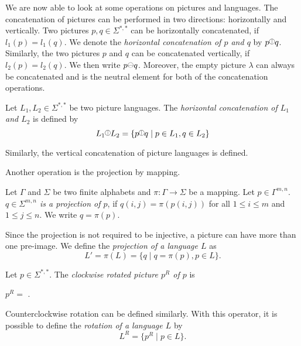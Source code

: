 We are now able to look at some operations on pictures and languages. The concatenation of pictures
can be performed in two directions: horizontally and vertically.
Two pictures $p, q \in \Sigma^{*,*}$ can be horizontally concatenated, if $l_1(p) = l_1(q)$. We denote
the \emph{horizontal concatenation of $p$ and $q$} by $p \hcat{} q$. Similarly, the two pictures $p$
and $q$ can be concatenated vertically, if $l_2(p) = l_2(q)$. We then write $p \vcat{} q$. Moreover,
the empty picture $\lambda$ can always be concatenated and is the neutral element for both of the
concatenation operations.
\begin{definition}
	Let $L_1, L_2 \in \Sigma^{*,*}$ be two picture languages. The \emph{horizontal concatenation of
	$L_1$ and $L_2$} is defined by 
	\[L_1 \hcat{} L_2 = \{p \hcat{} q \mid p \in L_1, q \in L_2\}\]
\end{definition}
Similarly, the vertical concatenation of picture languages is defined. 

Another operation is the projection by mapping.
\begin{definition}
	Let $\Gamma$ and $\Sigma$ be two finite alphabets and $\pi: \Gamma \rightarrow \Sigma$ be a
	mapping. Let $p \in \Gamma^{m,n}$. \emph{$q \in \Sigma^{m,n}$ is a projection of $p$}, if $q(i, j)
	= \pi(p(i, j))$ for all $1 \leq i \leq m$ and $1 \leq j \leq n$. We write $q = \pi(p)$.
\end{definition}
Since the projection is not required to be injective, a picture can have more than one pre-image. We
define the \emph{projection of a language $L$} as 
\[L' = \pi(L) = \{q \mid q = \pi(p), p \in L\}.\] 
\begin{definition}
	Let $p \in \Sigma^{*, *}$. The \emph{clockwise rotated picture $p^R$ of $p$} is 
	\begin{center}
	
		$p^R = $ .
	\end{center}
\end{definition}
Counterclockwise rotation can be defined similarly. With this operator, it is possible to define the
\emph{rotation of a language $L$} by 
\[L^R = \{p^R \mid p \in L\}.\] 

